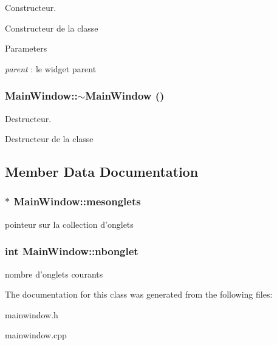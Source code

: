 Constructeur. 

Constructeur de la classe


\begin{DoxyParams}{Parameters}
\item[{\em parent}]: le widget parent \end{DoxyParams}
\hypertarget{classMainWindow_ae98d00a93bc118200eeef9f9bba1dba7}{
\subsubsection[{$\sim$MainWindow}]{\setlength{\rightskip}{0pt plus 5cm}MainWindow::$\sim$MainWindow ()}}
\label{classMainWindow_ae98d00a93bc118200eeef9f9bba1dba7}


Destructeur. 

Destructeur de la classe 

\subsection{Member Data Documentation}
\hypertarget{classMainWindow_a72524c4f5e0983c2aac8004226754b55}{
\subsubsection[{mesonglets}]{$\ast$ {\bf MainWindow::mesonglets}}}
\label{classMainWindow_a72524c4f5e0983c2aac8004226754b55}
pointeur sur la collection d'onglets \hypertarget{classMainWindow_aaa1984965e18d96e589cdc2216212656}{
\subsubsection[{nbonglet}]{\setlength{\rightskip}{0pt plus 5cm}int {\bf MainWindow::nbonglet}}}
\label{classMainWindow_aaa1984965e18d96e589cdc2216212656}
nombre d'onglets courants 

The documentation for this class was generated from the following files:\begin{DoxyCompactItemize}
\item 
mainwindow.h\item 
mainwindow.cpp\end{DoxyCompactItemize}
